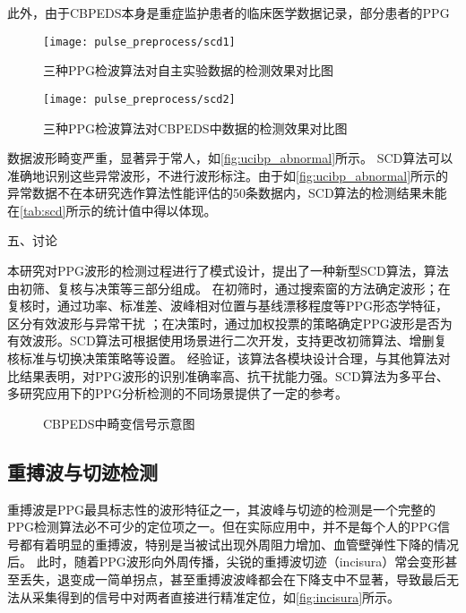 此外，由于CBPEDS本身是重症监护患者的临床医学数据记录，部分患者的PPG
\begin{figure}[htbp]
    \centering
    \texttt{[image: pulse\_preprocess/scd1]}
    \caption{\label{fig:scd_detect1}三种PPG检波算法对自主实验数据的检测效果对比图}
\end{figure}

\begin{figure}[htbp]
    \centering
    \texttt{[image: pulse\_preprocess/scd2]}
    \caption{\label{fig:scd_detect2}三种PPG检波算法对CBPEDS中数据的检测效果对比图}
\end{figure}
\noindent
数据波形畸变严重，显著异于常人，如\autoref{fig:ucibp_abnormal}所示。
SCD算法可以准确地识别这些异常波形，不进行波形标注。由于如\autoref{fig:ucibp_abnormal}所示的异常数据不在本研究选作算法性能评估的50条数据内，SCD算法的检测结果未能在\autoref{tab:scd}所示的统计值中得以体现。

五、讨论

本研究对PPG波形的检测过程进行了模式设计，提出了一种新型SCD算法，算法由初筛、复核与决策等三部分组成。
在初筛时，通过搜索窗的方法确定波形；在复核时，通过功率、标准差、波峰相对位置与基线漂移程度等PPG形态学特征，区分有效波形与异常干扰
；在决策时，通过加权投票的策略确定PPG波形是否为有效波形。SCD算法可根据使用场景进行二次开发，支持更改初筛算法、增删复核标准与切换决策策略等设置。
经验证，该算法各模块设计合理，与其他算法对比结果表明，对PPG波形的识别准确率高、抗干扰能力强。SCD算法为多平台、多研究应用下的PPG分析检测的不同场景提供了一定的参考。

\begin{figure}[h]
    \centering
    \quad
    \quad
    \caption{\label{fig:ucibp_abnormal}CBPEDS中畸变信号示意图}
\end{figure}

\subsection{重搏波与切迹检测}
重搏波是PPG最具标志性的波形特征之一，其波峰与切迹的检测是一个完整的PPG检测算法必不可少的定位项之一\cite{Wang2012}。但在实际应用中，并不是每个人的PPG信号都有着明显的重搏波，特别是当被试出现外周阻力增加、血管壁弹性下降的情况后\cite{mmt}。
此时，随着PPG波形向外周传播，尖锐的重搏波切迹（incisura）常会变形甚至丢失，退变成一简单拐点，甚至重搏波波峰都会在下降支中不显著，导致最后无法从采集得到的信号中对两者直接进行精准定位，如\autoref{fig:incisura}所示。

